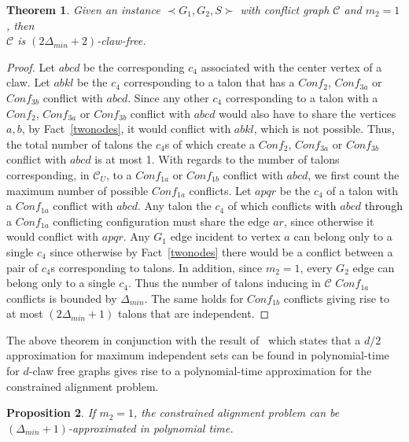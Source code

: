 \documentclass[final]{dmtcs-episciences}
\newtheorem{theorem}{Theorem}
\newtheorem{proposition}[theorem]{Proposition}
\newcommand\mar[1]{\textcolor{black}{#1}}
\begin{document}
\begin{theorem}
\label{claw}
Given an instance $\prec G_1,G_2,S \succ$ with conflict graph $\mathcal{C}$ and $m_2=1$, then\\ $\mathcal{C}$ is $(2\Delta_{min}+2)$-claw-free.\end{theorem}

\begin{proof}
Let $abcd$ be the corresponding $c_4$ associated with the center vertex of a claw. 
Let $abkl$ be the $c_4$ corresponding to a talon that has a $Conf_{2}$, $Conf_{3a}$ or $Conf_{3b}$  conflict with $abcd$. Since 
any other $c_4$ corresponding to a talon with a $Conf_{2}$, $Conf_{3a}$ or $Conf_{3b}$ conflict with $abcd$ would also 
have to share the vertices $a,b$, by Fact~\ref{twonodes}, 
it would conflict with $abkl$, which is not possible. Thus,
the total number of talons the $c_4$s of which create a $Conf_{2}$, $Conf_{3a}$ or $Conf_{3b}$ conflict with $abcd$
is at most 1. With regards to the number of talons corresponding, in $\mathcal{C}_U$, to  a  $Conf_{1a}$ or $Conf_{1b}$ 
conflict with $abcd$, we first count the maximum number  of possible $Conf_{1a}$ conflicts. 
Let $apqr$ be the $c_4$ of a talon with a $Conf_{1a}$  conflict with $abcd$. 
Any talon the $c_4$ of which conflicts \mar{with} $abcd$ \mar{through} a $Conf_{1a}$ conflicting configuration  must share the 
edge $ar$, since otherwise it would conflict with $apqr$. 
Any $G_1$ edge incident to vertex $a$ can belong only
to a single $c_4$ since otherwise by Fact~\ref{twonodes}
there would be a conflict between a pair of $c_4$s 
corresponding to talons. In addition, since $m_2=1$,
every $G_2$ edge can belong only to a single $c_4$. Thus
the number of talons inducing in $\mathcal{C}$ $Conf_{1a}$ conflicts is bounded by
$\Delta_{min}$. The same holds for $Conf_{1b}$ conflicts
giving rise to at most $(2\Delta_{min}+1)$ talons that 
are independent.
\end{proof}

The above theorem in conjunction with the result of~\citet{Berman00} which states 
that a $d/2$ approximation for maximum independent sets can be found 
in polynomial-time for $d$-claw free graphs gives rise to 
a polynomial-time approximation for the constrained alignment problem. 

\begin{proposition}  
If $m_2=1$, the constrained alignment problem can be $(\Delta_{min}+1)$-approximated in polynomial time.
\label{cor16}
\end{proposition}
\end{document}
